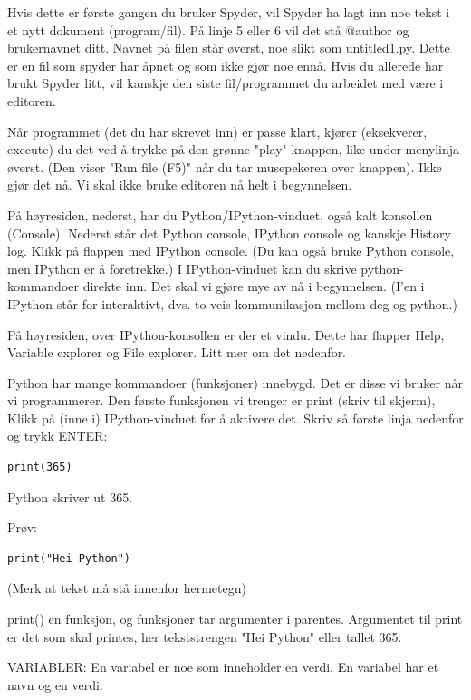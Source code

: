 Hvis dette er første gangen du bruker Spyder, vil Spyder ha lagt inn noe tekst i et nytt dokument (program/fil). På linje 5 eller 6 vil det stå @author og brukernavnet ditt. Navnet på filen står øverst, noe slikt som untitled1.py. Dette er en fil som spyder har åpnet og som ikke gjør noe ennå. Hvis du allerede har brukt Spyder litt, vil kanskje den siste fil/programmet du arbeidet med være i editoren.

Når programmet (det du har skrevet inn) er passe klart, kjører (eksekverer, execute) du det ved å trykke på den grønne "play"-knappen, like under menylinja øverst. (Den viser "Run file (F5)" når du tar musepekeren over knappen). Ikke gjør det nå. Vi skal ikke bruke editoren nå helt i begynnelsen.

På høyresiden, nederst, har du Python/IPython-vinduet, også kalt konsollen (Console). Nederst står det  Python console, IPython console og kanskje History log. Klikk på flappen med IPython console. (Du kan også bruke Python console, men IPython er å foretrekke.) I IPython-vinduet kan du skrive python-kommandoer direkte inn. Det skal vi gjøre mye av nå i begynnelsen. (I'en i IPython står for interaktivt, dvs. to-veis kommunikasjon mellom deg og python.) 

På høyresiden, over IPython-konsollen er der et vindu. Dette har flapper Help, Variable explorer og File explorer. Litt mer om det nedenfor. 

Python har mange kommandoer (funksjoner) innebygd. Det er disse vi bruker når vi programmerer. Den første funksjonen vi trenger er print (skriv til skjerm), Klikk på (inne i) IPython-vinduet for å aktivere det. Skriv så første linja nedenfor og trykk ENTER:
\begin{lstlisting}[caption={Din første Python kode}]
print(365)
\end{lstlisting}
Python skriver ut 365.

Prøv:
\begin{lstlisting}[caption={Din andre Python kode}]
print("Hei Python")
\end{lstlisting}

(Merk at tekst må stå innenfor hermetegn)

print() en funksjon, og funksjoner tar argumenter i parentes.
Argumentet til print er det som skal printes, her tekststrengen "Hei Python" eller tallet 365. 

VARIABLER: 
En variabel er noe som inneholder en verdi. 
En variabel har et navn og en verdi.

